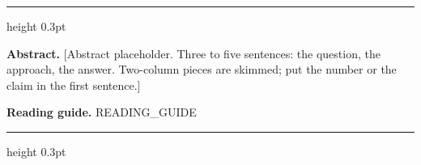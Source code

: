 {\color{hair}\hrule height 0.3pt}
\vspace{8pt}
\begin{center}
\begin{minipage}{0.92\textwidth}
\small\noindent\textbf{Abstract.}
[Abstract placeholder. Three to five sentences: the question, the approach, the answer. Two-column pieces are skimmed; put the number or the claim in the first sentence.]
\par\vspace{4pt}
\noindent\textbf{Reading guide.} {{READING_GUIDE}}
\end{minipage}
\end{center}
\vspace{6pt}
{\color{hair}\hrule height 0.3pt}
